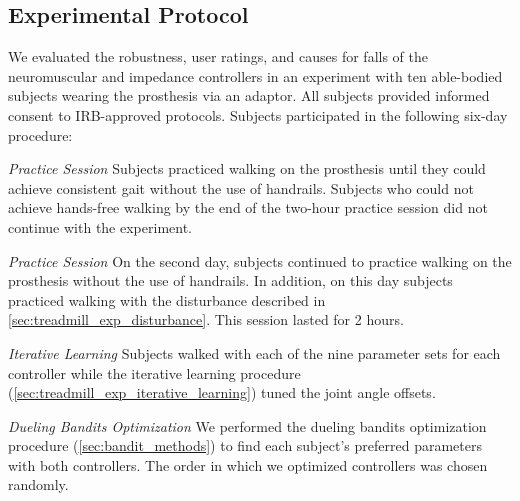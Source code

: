 \subsection{Experimental Protocol}

We evaluated the robustness, user ratings, and causes for falls of the
neuromuscular and impedance controllers in an experiment with ten able-bodied
subjects wearing the prosthesis via an adaptor. All subjects provided informed
consent to IRB-approved protocols. Subjects participated in the following
six-day procedure:


\begin{days}
    \item\label{list:exp_day_1} \emph{Practice Session} Subjects practiced
    walking on the prosthesis until they could achieve consistent gait without
    the use of handrails. Subjects who could not achieve hands-free walking by
    the end of the two-hour practice session did not continue with the
    experiment.

    \item\label{list:exp_day_2} \emph{Practice Session} On the second day,
    subjects continued to practice walking on the prosthesis without the use of
    handrails. In addition, on this day subjects practiced walking with the
    disturbance described in \cref{sec:treadmill_exp_disturbance}. This session
    lasted for 2 hours.

    \item\label{list:exp_day_3} \emph{Iterative Learning} Subjects walked with
    each of the nine parameter sets for each controller while the iterative
    learning procedure (\cref{sec:treadmill_exp_iterative_learning}) tuned the
    joint angle offsets. 

    \item\label{list:exp_day_4} \emph{Dueling Bandits Optimization} We performed
    the dueling bandits optimization procedure (\cref{sec:bandit_methods}) to
    find each subject's preferred parameters with both controllers. The order in
    which we optimized controllers was chosen randomly.


\end{days}

